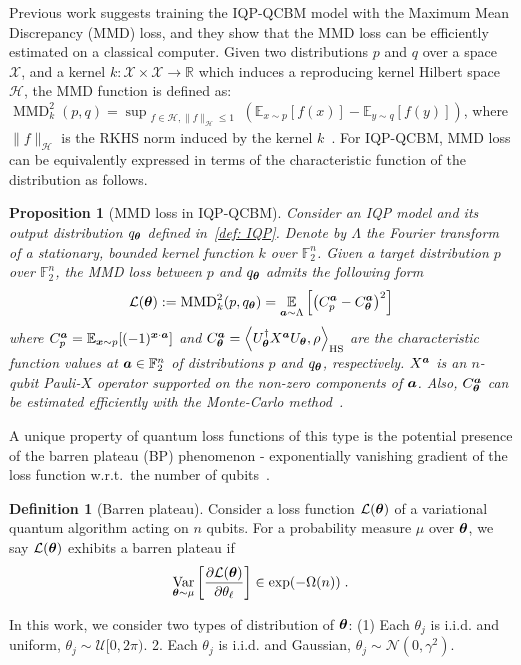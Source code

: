 \documentclass[10pt, twocolumn, a4paper]{article}
\theoremstyle{plain}
\newtheorem{proposition}[theorem]{Proposition}
\theoremstyle{definition}
\newtheorem{definition}[theorem]{Definition}
\theoremstyle{remark}
\newcommand{\HS}{\ensuremath{\mathrm{HS}}\xspace}
\begin{document}
Previous work \cite{recioarmengol25} suggests training the IQP-QCBM model with the Maximum Mean Discrepancy (MMD) loss, and they show that the MMD loss can be efficiently estimated on a classical computer. Given two distributions $p$ and $q$ over a space $\mathcal{X}$, and a kernel $k: \mathcal{X} \times \mathcal{X} \to \mathbb{R}$ which induces a reproducing kernel Hilbert space $\mathcal{H}$, the MMD function is defined as: $\operatorname{MMD}^2_k(p, q) = \sup_{\substack{f \in \mathcal{H},  \|f\|_{\mathcal{H}} \leq 1}} \left( \mathbb{E}_{x \sim p}[f(x)] - \mathbb{E}_{y \sim q}[f(y)] \right)$, where $\|f\|_{\mathcal{H}}$ is the RKHS norm induced by the kernel $k$~\citep{muandet17}. For IQP-QCBM, MMD loss can be equivalently expressed in terms of the characteristic function of the distribution as follows.

\begin{proposition} [MMD loss in IQP-QCBM]
Consider an IQP model and its output distribution $q_{\bm{\theta}}$ defined in~\cref{def: IQP}. Denote by $\Lambda$ the Fourier transform of a stationary, bounded kernel function $k$ over $\mathbb{F}_2^n$. Given a target distribution $p$ over $\mathbb{F}_2^n$, the MMD loss between $p$ and $q_{\bm{\theta}}$ admits the following form~\cite{rudolph24, recioarmengol25}
\begin{equation}
    \mathcal{L}({\bm{\theta}}) := \mathrm{MMD}^2_k(p, q_{\bm{\theta}}) = \operatorname*{\mathbb{E}}_{{\bm{a}} \sim \Lambda} \left[ \left( C^{\bm{a}}_p - C^{\bm{a}}_{\bm{\theta}} \right)^2 \right]
\end{equation}
where $C^{\bm{a}}_p = \operatorname*{\mathbb{E}}_{{\bm{x}} \sim p}[(-1)^{{\bm{x}} \cdot {\bm{a}}}]$ and $C^\vta_\vttheta=\inner{U_\vttheta^\dagger X^{\vta}U_\vttheta}{\rho }_{\HS}$ are the characteristic function values at ${\bm{a}}\in\mathbb{F}_2^n$ of distributions $p$ and $q_{\bm{\theta}}$, respectively.  $X^{\bm{a}}$ is an $n$-qubit Pauli-$X$ operator supported on the non-zero components of ${\bm{a}}$. Also, $C^{\bm{a}}_{\bm{\theta}}$ can be estimated efficiently with the Monte-Carlo method~\cite{recioarmengol25}.  
\end{proposition}


A unique property of quantum loss functions of this type is the potential presence of the barren plateau (BP) phenomenon - exponentially vanishing gradient of the loss function w.r.t.~the number of qubits~\cite{mcclean18}. 
\begin{definition}[Barren plateau]
Consider a loss function $\mathcal{L}({\bm{\theta}})$ of a variational quantum algorithm acting on $n$ qubits. For a probability measure $\mu$ over ${\bm{\theta}}$, we say $\mathcal{L}({\bm{\theta}})$ exhibits a barren plateau if
\begin{equation}
\operatorname*{Var}_{{\bm{\theta}}\sim \mu} \left[\frac{\partial \mathcal{L}({\bm{\theta}})}{\partial{\theta_\ell}}\right] \in \exp({-\Omega(n)})\;.
\end{equation}
\end{definition}
In this work, we consider two types of distribution of ${\bm{\theta}}$: (1) Each $\theta_j$ is i.i.d. and uniform, $\theta_j \sim \mathcal{U}[0,2\pi)$. 2. Each $\theta_j$ is i.i.d. and Gaussian, $\theta_j \sim \mathcal{N}(0,\gamma^2)$. \\
\end{document}
